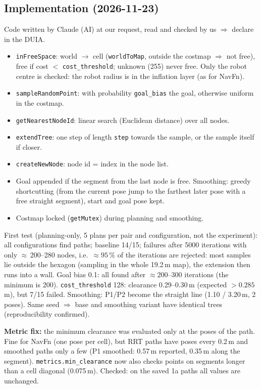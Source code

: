 \documentclass[10pt]{article}
\newcommand{\pkg}[1]{\texttt{#1}}
\begin{document}
\subsection{Implementation (2026-11-23)}
Code written by Claude (AI) at our request, read and checked by us $\Rightarrow$ declare in the DUIA.
\begin{itemize}
  \item \pkg{inFreeSpace}: world $\rightarrow$ cell (\pkg{worldToMap}, outside the costmap $\Rightarrow$ not free),
        free if cost $<$ \pkg{cost\_threshold}; unknown (255) never free. Only the robot centre is checked: the
        robot radius is in the inflation layer (as for NavFn).
  \item \pkg{sampleRandomPoint}: with probability \pkg{goal\_bias} the goal, otherwise uniform in the costmap.
  \item \pkg{getNearestNodeId}: linear search (Euclidean distance) over all nodes.
  \item \pkg{extendTree}: one step of length \pkg{step} towards the sample, or the sample itself if closer.
  \item \pkg{createNewNode}: node id = index in the node list.
  \item Goal appended if the segment from the last node is free. Smoothing: greedy shortcutting (from the current
        pose jump to the farthest later pose with a free straight segment), start and goal pose kept.
  \item Costmap locked (\pkg{getMutex}) during planning and smoothing.
\end{itemize}
First test (planning-only, 5 plans per pair and configuration, not the experiment): all configurations find paths;
baseline 14/15; failures after 5000 iterations with only $\approx$\,200--280 nodes, i.e.\ $\approx 95\,\%$ of the
iterations are rejected: most samples lie outside the hexagon (sampling in the whole 19.2\,m map), the extension
then runs into a wall. Goal bias 0.1: all found after $\approx 200$--300 iterations (the minimum is 200).
\pkg{cost\_threshold} 128: clearance 0.29--0.30\,m (expected $> 0.285$\,m), but 7/15 failed. Smoothing: P1/P2 become
the straight line (1.10 / 3.20\,m, 2 poses). Same seed $\Rightarrow$ base and smoothing variant have identical trees
(reproducibility confirmed).

\textbf{Metric fix:} the minimum clearance was evaluated only at the poses of the path. Fine for NavFn (one pose
per cell), but RRT paths have poses every 0.2\,m and smoothed paths only a few (P1 smoothed: 0.57\,m reported,
0.35\,m along the segment). \pkg{metrics.min\_clearance} now also checks points on segments longer than a cell
diagonal (0.075\,m). Checked: on the saved 1a paths all values are unchanged.
\end{document}
